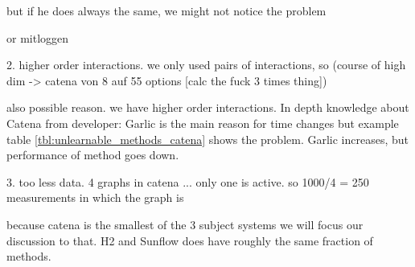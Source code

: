 but if he does always the same, we might not notice the problem

or mitloggen

2. higher order interactions. 
we only used pairs of interactions, so (course of high dim -> catena von 8 auf 55 options [calc the fuck 3 times thing])

also possible reason. we have higher order interactions. In depth knowledge about Catena from developer: Garlic is the main reason for time changes but example table \ref{tbl:unlearnable_methods_catena} shows the problem. Garlic increases, but performance of method goes down.

3. too less data. 4 graphs in catena ... only one is active. so 1000/4 = 250 measurements in which the graph is 

because catena is the smallest of the 3 subject systems we will focus our discussion to that. H2 and Sunflow does have roughly the same fraction of methods. 